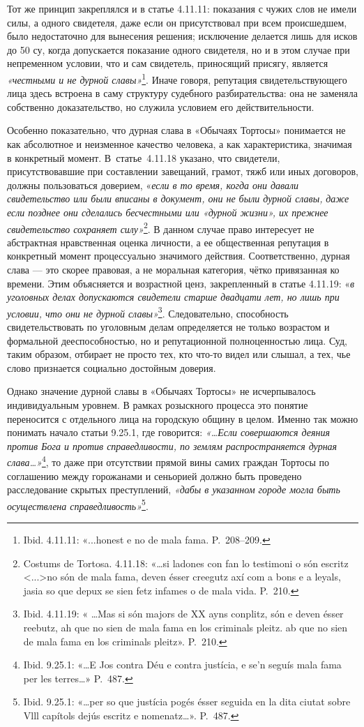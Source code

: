 Тот же принцип закреплялся и в статье 4.11.11: показания с чужих слов не имели силы, а одного свидетеля, даже если он присутствовал при всем происшедшем, было недостаточно для вынесения решения; исключение делается лишь для исков до 50 су, когда допускается показание одного свидетеля, но и в этом случае при непременном условии, что и сам свидетель, приносящий присягу, является \emph{«честными и не дурной славы»}\footnote{Ibid. 4.11.11: «...honest e no de mala fama. P.~208--209.}. Иначе говоря, репутация свидетельствующего лица здесь встроена в саму структуру судебного разбирательства: она не заменяла собственно доказательство, но служила условием его действительности.

Особенно показательно, что дурная слава в «Обычаях Тортосы» понимается не как абсолютное и неизменное качество человека, а как характеристика, значимая в конкретный момент. В~статье~4.11.18 указано, что свидетели, присутствовавшие при составлении завещаний, грамот, тяжб или иных договоров, должны пользоваться доверием, «\emph{если в то время, когда они давали свидетельство или были вписаны в документ, они не были дурной славы,} \emph{даже если позднее они сделались бесчестными или «дурной жизни», их прежнее свидетельство сохраняет силу»}\footnote{Costums de Tortosa. 4.11.18: «…si ladones con fan lo testimoni o són escritz <...>no són de mala fama, deven ésser creegutz axí com a bons e a leyals, jasia so que depux se sien fetz infames o de mala vida. P.~210.}. В данном случае право интересует не абстрактная нравственная оценка личности, а ее общественная репутация в конкретный момент процессуально значимого действия. Соответственно, дурная слава --- это скорее правовая, а не моральная категория, чётко привязанная ко времени. Этим объясняется и возрастной ценз, закрепленный в статье 4.11.19: «\emph{в уголовных делах допускаются свидетели старше двадцати лет, но лишь при условии, что они не дурной славы»}\footnote{Ibid. 4.11.19: « …Mas si són majors de XX ayns conplitz, són e deven ésser reebutz, ah que no sien de mala fama en los criminals pleitz. ab que no sien de mala fama en los criminals pleitz». P.~210.}. Следовательно, способность свидетельствовать по уголовным делам определяется не только возрастом и формальной дееспособностью, но и репутационной полноценностью лица. Суд, таким образом, отбирает не просто тех, кто что-то видел или слышал, а тех, чье слово признается социально достойным доверия.

Однако значение дурной славы в «Обычаях Тортосы» не исчерпывалось индивидуальным уровнем. В рамках розыскного процесса это понятие переносится с отдельного лица на городскую общину в целом. Именно так можно понимать начало статьи 9.25.1, где говорится: \emph{«…Если совершаются деяния против Бога и против справедливости, по землям распространяется дурная слава…»}\footnote{Ibid. 9.25.1: «…E Jos contra Déu e contra justícia, e se'n seguís mala fama per les terres…» P.~487.}, то даже при отсутствии прямой вины самих граждан Тортосы по соглашению между горожанами и сеньорией должно быть проведено расследование скрытых преступлений, \emph{«дабы в указанном городе могла быть осуществлена справедливость»}\footnote{Ibid. 9.25.1: «…per so que justícia pogés ésser seguida en la dita ciutat sobre Vlll capítols dejús escritz e nomenatz…». P.~487.}.


